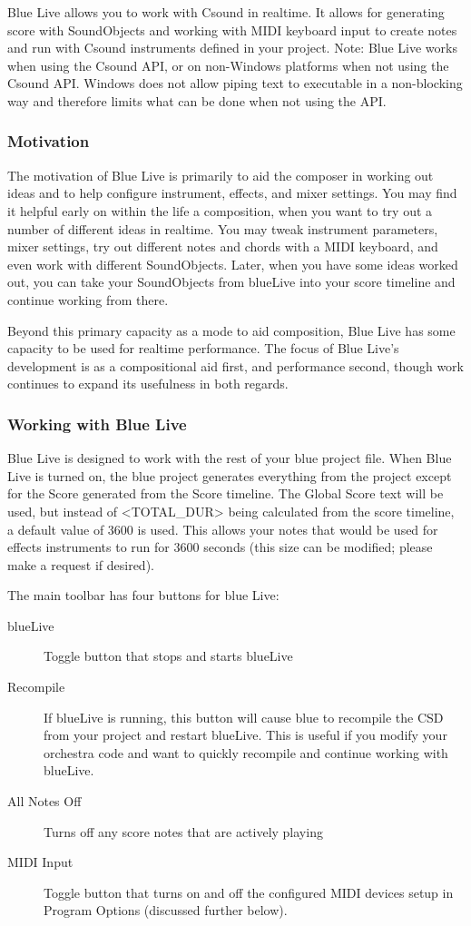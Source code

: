 Blue Live allows you to work with Csound in realtime. It allows for
generating score with SoundObjects and working with MIDI keyboard input
to create notes and run with Csound instruments defined in your project.
Note: Blue Live works when using the Csound API, or on non-Windows
platforms when not using the Csound API. Windows does not allow piping
text to executable in a non-blocking way and therefore limits what can
be done when not using the API.

\subsubsection{Motivation}

The motivation of Blue Live is primarily to aid the composer in working
out ideas and to help configure instrument, effects, and mixer settings.
You may find it helpful early on within the life a composition, when you
want to try out a number of different ideas in realtime. You may tweak
instrument parameters, mixer settings, try out different notes and
chords with a MIDI keyboard, and even work with different SoundObjects.
Later, when you have some ideas worked out, you can take your
SoundObjects from blueLive into your score timeline and continue working
from there.

Beyond this primary capacity as a mode to aid composition, Blue Live has
some capacity to be used for realtime performance. The focus of Blue
Live's development is as a compositional aid first, and performance
second, though work continues to expand its usefulness in both regards.

\subsubsection{Working with Blue Live}

Blue Live is designed to work with the rest of your blue project file.
When Blue Live is turned on, the blue project generates everything from
the project except for the Score generated from the Score timeline. The
Global Score text will be used, but instead of
\textless{}TOTAL\_DUR\textgreater{} being calculated from the score
timeline, a default value of 3600 is used. This allows your notes that
would be used for effects instruments to run for 3600 seconds (this size
can be modified; please make a request if desired).

The main toolbar has four buttons for blue Live:

\begin{description}
\item[blueLive]
Toggle button that stops and starts blueLive
\item[Recompile]
If blueLive is running, this button will cause blue to recompile the CSD
from your project and restart blueLive. This is useful if you modify
your orchestra code and want to quickly recompile and continue working
with blueLive.
\item[All Notes Off]
Turns off any score notes that are actively playing
\item[MIDI Input]
Toggle button that turns on and off the configured MIDI devices setup in
Program Options (discussed further below).
\end{description}

